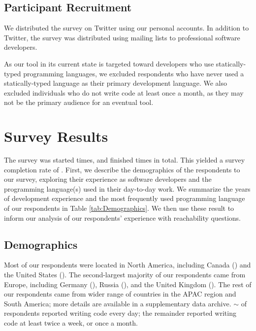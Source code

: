 
\subsection{Participant Recruitment}
\label{subsec:ParticipantRecruitment}

\noindent
We distributed the survey on Twitter using our personal accounts.
In addition to Twitter, the survey was distributed using mailing lists to
professional software developers.

\par As our tool in its current state is targeted toward developers who
use statically-typed programming languages, we excluded respondents who have
never used a statically-typed language as their primary development language.
We also excluded individuals who do not write code at least once a month,
as they may not be the primary audience for an eventual tool.

\section{Survey Results}
\label{sec:SurveyResults}

The survey was started \numStarted{} times, and finished \numFinished{} times
in total. 
This yielded a survey completion rate of \printpcnt{\numFinished}{\numStarted}.
First, we describe the demographics of the respondents to our survey, exploring
their experience as software developers and the programming language(s) used
in their day-to-day work. 
We summarize the years of development experience and the most frequently
used programming language of our respondents in Table \ref{tab:Demographics}.
We then use these result to inform our analysis of our respondents' experience
with reachability questions.

\subsection{Demographics}
\label{subsec:Demographics}

Most of our respondents were located in North America, including Canada 
(\canada{})
and the United States (\usa{}).
The second-largest majority of our respondents came from Europe, including
Germany (\germany{}), Russia (\russia{}), and the United Kingdom (\uk{}).
The rest of our respondents came from wider range of countries in the APAC
region and South America; more details are available in a supplementary data 
archive.
$\sim$\printpcnt{\writeCodeDaily}{\numFinished} of respondents reported 
writing code every day; the remainder reported writing code at least twice a
week, or once a month.

